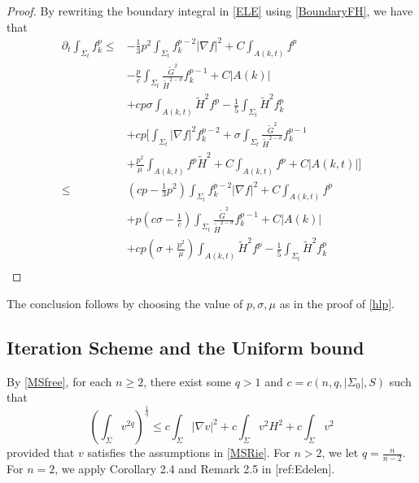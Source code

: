 \begin{proof}
    By rewriting the boundary integral in \autoref{ELE} using \autoref{BoundaryFH}, we have that
    \begin{equation*}
        \begin{split}
            \partial_t \int_{\Sigma_t} f_k^p
        \leq &  -\frac{1}{3}p^2 \int_{\Sigma_t} f_{k}^{p-2}\left| \nabla f \right| ^2+C \int_{A(k,t)} f^p  \\
        &-\frac{p}{c} \int_{\Sigma_t} \frac{\tilde{G}^2}{\tilde{H}^{2-\sigma }}f_{k}^{p-1}+C \left| A(k) \right|\\
        &+cp \sigma \int_{A(k,t)}^{}\tilde{H}^2f^p-\frac{1}{5}\int_{\Sigma_t} \tilde{H}^2f_{k}^{p} \\
        &+cp \bigg[  \int_{\Sigma_t} \left| \nabla f \right| ^2 f_{k}^{p-2} + \sigma \int_{\Sigma_t} \frac{\tilde{G}^{2} }{\tilde{H}^{2-\sigma } } f_{k}^{p-1} \\
        &+ \frac{p^2}{\mu }\int_{A(k,t)}^{}f^p \tilde{H}^{2} + C \int_{A(k,t)}^{}f^p + C \left| A(k,t) \right|\bigg]\\
        \leq & \left( cp-\frac{1}{3}p^2 \right) \int_{\Sigma_t} f_{k}^{p-2}\left| \nabla f \right| ^2+C \int_{A(k,t)} f^p  \\
        &+ p\left( c\sigma - \frac{1}{c} \right) \int_{\Sigma_t} \frac{\tilde{G}^2}{\tilde{H}^{2-\sigma }}f_{k}^{p-1}+C \left| A(k) \right|\\
        &+ cp\left(  \sigma + \frac{p^2}{\mu } \right) \int_{A(k,t)}^{}\tilde{H}^2f^p-\frac{1}{5}\int_{\Sigma_t} \tilde{H}^2f_{k}^{p}\\
        \end{split}
        \end{equation*}
\end{proof}
The conclusion follows by choosing the value of $p,\sigma ,\mu $ as in the proof of \autoref{hlp}. 

\subsection{Iteration Scheme and the Uniform bound}

By \autoref{MSfree}, for each $n \geq 2$, there exist some $q>1$ and $c=c(n,q,\left| \Sigma_0 \right|,S )$ such that
\[\left( \int_{\Sigma} v^{2q} \right) ^{\frac{1}{q}} \leq c \int_{\Sigma} \left| \nabla v \right| ^2 + c \int_{\Sigma} v^2 H^2 + c \int_{\Sigma} v^2\]
provided that $v$ satisfies the assumptions in \autoref{MSRie}.
For $n>2$, we let $q=\frac{n}{n-2}$. For $n=2$, we apply Corollary 2.4 and Remark 2.5 in [ref:Edelen].

